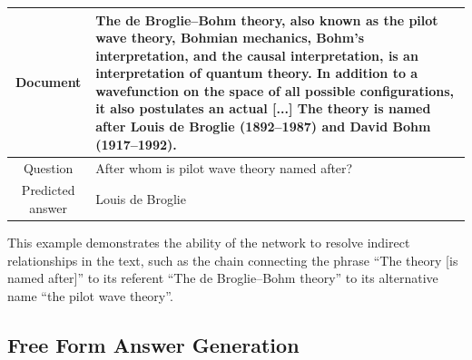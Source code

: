 \vspace{1cm}
\begin{table}
\begin{tabular}{|c|p{}|}
    \hline
    Document & The de Broglie–Bohm theory, also known as the pilot wave theory, Bohmian mechanics, Bohm's interpretation, and the causal interpretation, is an interpretation of quantum theory. In addition to a wavefunction on the space of all possible configurations, it also postulates an actual [...] The theory is named after Louis de Broglie (1892–1987) and David Bohm (1917–1992). \\
    \hline
    Question & After whom is pilot wave theory named after? \\
    \hline
    Predicted answer & Louis de Broglie \\
    \hline
\end{tabular}
\end{table}

\vspace{1cm}

This example demonstrates the ability of the network to resolve indirect relationships in the text, such as the chain connecting the phrase ``The theory [is named after]'' to its referent ``The de Broglie–Bohm theory'' to its alternative name ``the pilot wave theory''.


\subsection{Free Form Answer Generation}

